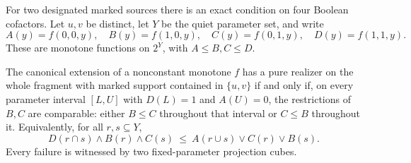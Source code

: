 For two designated marked sources there is an exact condition on four
Boolean cofactors. Let $u,v$ be distinct, let $Y$ be the quiet parameter
set, and write
\[
 A(y)=f(0,0,y),\quad B(y)=f(1,0,y),\quad
 C(y)=f(0,1,y),\quad D(y)=f(1,1,y).
\]
These are monotone functions on $2^Y$, with $A\leq B,C\leq D$.

\begin{theorem}
\label{core:thm:two-marked-cofactors}
The canonical extension of a nonconstant monotone $f$ has a pure realizer
on the whole fragment with marked support contained in $\{u,v\}$ if and
only if, on every parameter interval $[L,U]$ with $D(L)=1$ and $A(U)=0$,
the restrictions of $B,C$ are comparable: either $B\leq C$ throughout
that interval or $C\leq B$ throughout it. Equivalently, for all $r,s\subseteq Y$,
\begin{equation}\label{core:eq:two-marked-cofactor-test}
 D(r\cap s)\wedge B(r)\wedge C(s)
 \ \leq\ A(r\cup s)\vee C(r)\vee B(s).
\end{equation}
Every failure is witnessed by two fixed-parameter projection cubes.
\end{theorem}
